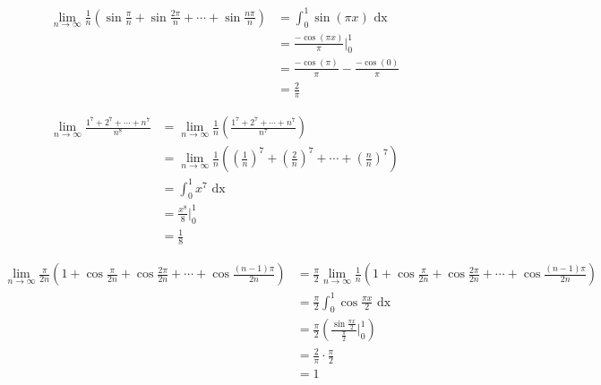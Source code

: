 \documentclass[a4paper,12pt]{article}
\newcommand{\?}{\stackrel{?}{=}}
\begin{document}
\begin{my_example}
\begin{align*}
  \lim_{n\to\infty} \frac1n\left(\sin\frac{\pi}{n} + \sin\frac{2\pi}{n} + \cdots + \sin\frac{n\pi}{n}\right) &= \int_{0}^{1} \sin(\pi x) \text{ dx}\\
  &= \frac{-\cos(\pi x)}{\pi} \Bigg|_{0}^{1}\\
  &= \frac{-\cos(\pi)}{\pi} - \frac{-\cos(0)}{\pi}\\
  &= \frac2\pi
\end{align*}
\end{my_example}
\begin{my_example}
\begin{align*}
  \lim_{n\to\infty} \frac{1^7 + 2^7 + \cdots + n^7}{n^8} &= \lim_{n\to\infty} \frac1n \left(\frac{1^7 + 2^7 + \cdots + n^7}{n^7}\right)\\
  &= \lim_{n\to\infty} \frac1n \left(\left(\frac{1}{n}\right)^7 + \left(\frac{2}{n}\right)^7 + \cdots + \left(\frac{n}{n}\right)^7\right)\\
  &= \int_0^1 x^7 \text{ dx}\\
  &= \frac{x^8}{8} \Big|_0^1\\
  &= \frac18
\end{align*}
\end{my_example}
\begin{my_example}
\begin{align*}
  \lim_{n\to\infty} \frac{\pi}{2n} \left(1+\cos{\frac{\pi}{2n}} + \cos{\frac{2\pi}{2n}} + \cdots + \cos{\frac{(n-1)\pi}{2n}}\right) &= \frac{\pi}{2} \lim_{n\to\infty} \frac{1}{n} \left(1+\cos{\frac{\pi}{2n}} + \cos{\frac{2\pi}{2n}} + \cdots + \cos{\frac{(n-1)\pi}{2n}}\right)\\
  &= \frac{\pi}{2} \int_0^1 \cos{\frac{\pi x}{2}} \text{ dx}\\
  &= \frac{\pi}{2} \left(\frac{\sin{\frac{\pi x}{2}}}{\frac{\pi}{2}} \Big|_0^1\right)\\
  &= \frac{2}{\pi} \cdot \frac{\pi}{2}\\
  &= 1
\end{align*}
\end{my_example}
\end{document}
